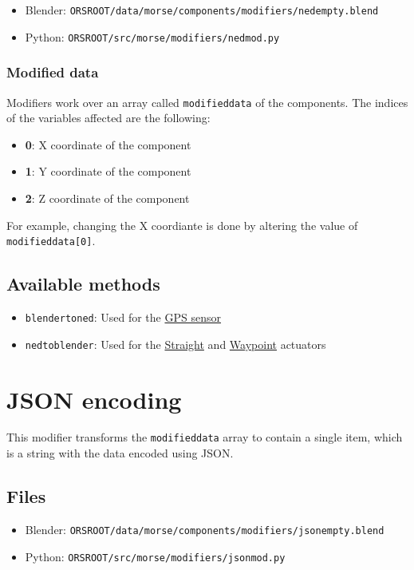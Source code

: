 \documentclass[twoside,a4paper,10pt]{report}
\newcommand{\dokutitlelevelone}[1]{\chapter{#1}}
\newcommand{\dokutitleleveltwo}[1]{\section{#1}}
\newcommand{\dokutitleleveltree}[1]{\subsection{#1}}
\newcommand{\dokubold}[1]{\textbf{#1}}
\newcommand{\dokumonospace}[1]{\texttt{#1}}
\newcommand{\dokuitem}{\item}
\begin{document}
\begin{itemize}
\dokuitem  Blender: \dokumonospace{{\textdollar}ORS{\textunderscore}ROOT/data/morse/components/modifiers/ned{\textunderscore}empty.blend}
\dokuitem  Python: \dokumonospace{{\textdollar}ORS{\textunderscore}ROOT/src/morse/modifiers/ned{\textunderscore}mod.py}
\end{itemize}

\dokutitleleveltree{Modified data}
\label{c1a1a093b7ca2545d0d88cac0ff8ccf6}%
Modifiers work over an array called \dokumonospace{modified{\textunderscore}data} of the components.
The indices of the variables affected are the following:


\begin{itemize}
\dokuitem  \dokubold{0}: X coordinate of the component
\dokuitem  \dokubold{1}: Y coordinate of the component
\dokuitem  \dokubold{2}: Z coordinate of the component
\end{itemize}

For example, changing the X coordiante is done by altering the value of \dokumonospace{modified{\textunderscore}data[0]}.


\dokutitleleveltwo{Available methods}
\label{a2d06dcb42bbd0519b19166fd7f36cea}%

\begin{itemize}
\dokuitem  \dokumonospace{blender{\textunderscore}to{\textunderscore}ned}: Used for the \hyperref[11648e4e66e7ed6a86cb7f1d0cf604fe]{ GPS sensor}
\dokuitem  \dokumonospace{ned{\textunderscore}to{\textunderscore}blender}: Used for the \hyperref[6990a54322d9232390a784c5c9247dd6]{ Straight} and \hyperref[f75862c2bd0040eb683048c313dcaaa8]{ Waypoint} actuators
\end{itemize}

\dokutitlelevelone{JSON encoding}
\label{2e3b13382733d486a7c0529f6a875385}%
\label{466deec76ecdf5fca6d38571f6324d54}%
This modifier transforms the \dokumonospace{modified{\textunderscore}data} array to contain a single item, which is a string with the data encoded using JSON.


\dokutitleleveltwo{Files}
\label{45b963397aa40d4a0063e0d85e4fe7a1}%

\begin{itemize}
\dokuitem  Blender: \dokumonospace{{\textdollar}ORS{\textunderscore}ROOT/data/morse/components/modifiers/json{\textunderscore}empty.blend}
\dokuitem  Python: \dokumonospace{{\textdollar}ORS{\textunderscore}ROOT/src/morse/modifiers/json{\textunderscore}mod.py}
\end{itemize}
\end{document}
